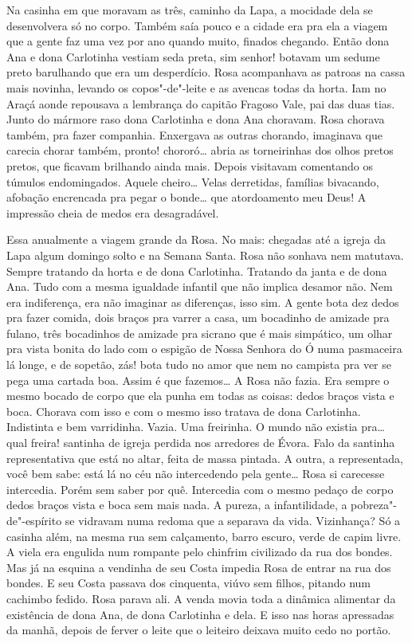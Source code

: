 Na casinha em que moravam as três, caminho da Lapa, a mocidade dela se
desenvolvera só no corpo. Também saía pouco e a cidade era pra ela a
viagem que a gente faz uma vez por ano quando muito, finados chegando.
Então dona Ana e dona Carlotinha vestiam seda preta, sim senhor! botavam
um sedume preto barulhando que era um desperdício. Rosa acompanhava as
patroas na cassa mais novinha, levando os copos"-de"-leite e as avencas
todas da horta. Iam no Araçá aonde repousava a lembrança do capitão
Fragoso Vale, pai das duas tias. Junto do mármore raso dona Carlotinha e
dona Ana choravam. Rosa chorava também, pra fazer companhia. Enxergava
as outras chorando, imaginava que carecia chorar também, pronto!
chororó\ldots{} abria as torneirinhas dos olhos pretos pretos, que ficavam
brilhando ainda mais. Depois visitavam comentando os túmulos
endomingados. Aquele cheiro\ldots{} Velas derretidas, famílias bivacando,
afobação encrencada pra pegar o bonde\ldots{} que atordoamento meu Deus! A
impressão cheia de medos era desagradável.

Essa anualmente a viagem grande da Rosa. No mais: chegadas até a igreja
da Lapa algum domingo solto e na Semana Santa. Rosa não sonhava nem
matutava. Sempre tratando da horta e de dona Carlotinha. Tratando da
janta e de dona Ana. Tudo com a mesma igualdade infantil que não implica
desamor não. Nem era indiferença, era não imaginar as diferenças, isso
sim. A gente bota dez dedos pra fazer comida, dois braços pra varrer a
casa, um bocadinho de amizade pra fulano, três bocadinhos de amizade pra
sicrano que é mais simpático, um olhar pra vista bonita do lado com o
espigão de Nossa Senhora do Ó numa pasmaceira lá longe, e de sopetão,
zás! bota tudo no amor que nem no campista pra ver se pega uma cartada
boa. Assim é que fazemos\ldots{} A Rosa não fazia. Era sempre o mesmo bocado
de corpo que ela punha em todas as coisas: dedos braços vista e boca.
Chorava com isso e com o mesmo isso tratava de dona Carlotinha.
Indistinta e bem varridinha. Vazia. Uma freirinha. O mundo não existia
pra\ldots{} qual freira! santinha de igreja perdida nos arredores de Évora.
Falo da santinha representativa que está no altar, feita de massa
pintada. A outra, a representada, você bem sabe: está lá no céu não
intercedendo pela gente\ldots{} Rosa si carecesse intercedia. Porém sem saber
por quê. Intercedia com o mesmo pedaço de corpo dedos braços vista e
boca sem mais nada. A pureza, a infantilidade, a pobreza"-de"-espírito se
vidravam numa redoma que a separava da vida. Vizinhança? Só a casinha
além, na mesma rua sem calçamento, barro escuro, verde de capim livre. A
viela era engulida num rompante pelo chinfrim civilizado da rua dos
bondes. Mas já na esquina a vendinha de seu Costa impedia Rosa de entrar
na rua dos bondes. E seu Costa passava dos cinquenta, viúvo sem filhos,
pitando num cachimbo fedido. Rosa parava ali. A venda movia toda a
dinâmica alimentar da existência de dona Ana, de dona Carlotinha e dela.
E isso nas horas apressadas da manhã, depois de ferver o leite que o
leiteiro deixava muito cedo no portão.

